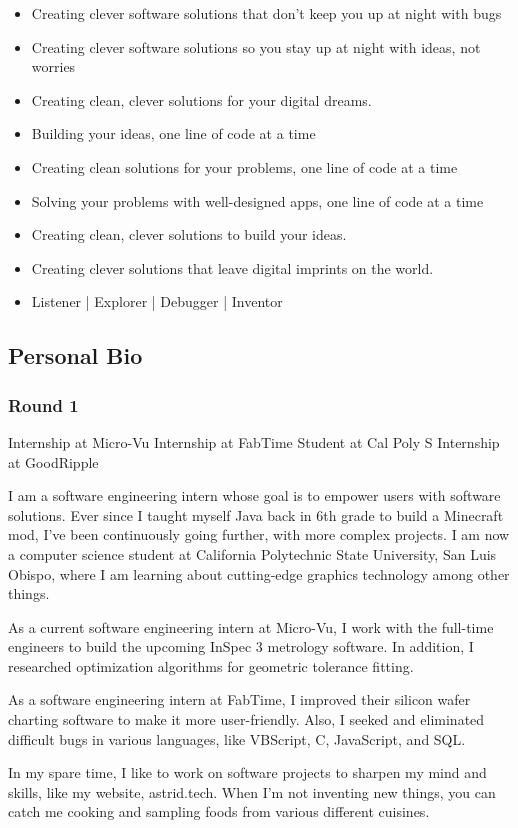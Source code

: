 \begin{itemize}
    \item Creating clever software solutions that don't keep you up at night with bugs
    \item Creating clever software solutions so you stay up at night with ideas, not worries
    \item Creating clean, clever solutions for your digital dreams.
    \item Building your ideas, one line of code at a time
    \item Creating clean solutions for your problems, one line of code at a time
    \item Solving your problems with well-designed apps, one line of code at a time
    \item Creating clean, clever solutions to build your ideas.
    \item Creating clever solutions that leave digital imprints on the world.
    \item Listener | Explorer | Debugger | Inventor
\end{itemize}

\subsection{Personal Bio}

\subsubsection{Round 1}

\begin{outline}
    \1 Internship at Micro-Vu
        \2 
    \1 Internship at FabTime
    \1 Student at Cal Poly
        \2 S
    \1 Internship at GoodRipple
\end{outline}

I am a software engineering intern whose goal is to empower users with software solutions. Ever since I taught myself Java back in 6th grade to build a Minecraft mod, I've been continuously going further, with more complex projects. I am now a computer science student at California Polytechnic State University, San Luis Obispo, where I am learning about cutting-edge graphics technology among other things. 

As a current software engineering intern at Micro-Vu, I work with the full-time engineers to build the upcoming InSpec 3 metrology software. In addition, I researched optimization algorithms for geometric tolerance fitting.

As a software engineering intern at FabTime, I improved their silicon wafer charting software to make it more user-friendly. Also, I seeked and eliminated difficult bugs in various languages, like VBScript, C, JavaScript, and SQL.

In my spare time, I like to work on software projects to sharpen my mind and skills, like my website, astrid.tech. When I'm not inventing new things, you can catch me cooking and sampling foods from various different cuisines. 

